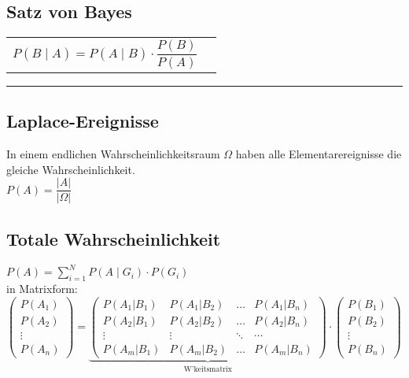 \begin{minipage}{7cm}
\vspace{3mm}
\subsection{Satz von Bayes }
\begin{tabular}{ll}
  $P(B\mid A)=P(A\mid B) \cdot\dfrac{P(B)}{P(A)}$
  \vspace{1mm}
\end{tabular}
\hrule

\subsection{Laplace-Ereignisse }
In einem endlichen Wahrscheinlichkeitsraum $\Omega$ haben alle
Elementarereignisse die gleiche Wahrscheinlichkeit. \\
$P(A)=\dfrac{\left| A\right|}{\left|\Omega\right|}$ \\


\end{minipage}
\hspace{5mm}
\begin{minipage}{12cm}
\hspace{2mm}
\subsection{Totale Wahrscheinlichkeit }
	$P(A)=\sum\limits_{i=1}^N P(A\mid G_i)\cdot P(G_i)$ \\
	
	in Matrixform: \\
	$\begin{pmatrix}P(A_1)\\P(A_2)\\\vdots\\P(A_n)\end{pmatrix} = 
	\underbrace{\begin{pmatrix}P(A_1|B_1) & P(A_1|B_2) & \ldots & P(A_1|B_n) \\
	P(A_2|B_1) & P(A_2|B_2) & \ldots & P(A_2|B_n) \\
	\vdots & \vdots & \ddots & \cdots \\
	P(A_m|B_1) & P(A_m|B_2) & \ldots & P(A_m|B_n)\end{pmatrix}}_{\text{W'keitsmatrix}}
	\cdot \begin{pmatrix}P(B_1)\\P(B_2)\\\vdots\\P(B_n)\end{pmatrix}$
\end{minipage}